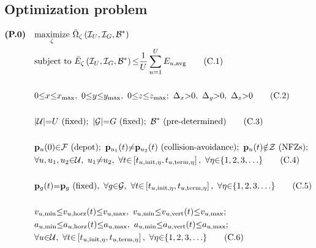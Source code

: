 \documentclass{article}
\begin{document}
\subsection{Optimization problem}
\begin{align}
    \textbf{(P.0)}\ \ \ &\underset{\zeta}{\mathrm{maximize}}\ \Bar{\Omega}_{\zeta}\left(\mathcal{I}_{U},\mathcal{I}_{G},\mathcal{B}^{*}\right)\nonumber\\
    &\text{subject to }\Bar{E}_{\zeta}\left(\mathcal{I}_{U},\mathcal{I}_{G},\mathcal{B}^{*}\right){\leq}\frac{1}{U}\sum_{u{=}1}^{U}E_{u,\mathrm{avg}}\label{Avg_energy_constraint}\tag{C.1}\\\nonumber\\
    &0{\leq}x{\leq}x_{\mathrm{max}},\ 0{\leq}y{\leq}y_{\mathrm{max}},\ 0{\leq}z{\leq}z_{\mathrm{max}};\ \Delta_{x}{>}0,\ \Delta_{y}{>}0,\ \Delta_{z}{>}0\label{Grid_tessellation_constraint}\tag{C.2}\\\nonumber\\
    &|\mathcal{U}|{=}U\text{ (fixed)};\ |\mathcal{G}|{=}G\text{ (fixed)};\ \mathcal{B}^{*}\text{ (pre-determined)}\label{Fixed_deployment_constraints}\tag{C.3}\\\nonumber\\
    &\mathbf{p}_{u}(0){\in}\mathcal{F}\text{ (depot)};\ \mathbf{p}_{u_{1}}(t){\neq}\mathbf{p}_{u_{2}}(t)\text{ (collision-avoidance)};\ \mathbf{p}_{u}(t){\notin}\mathcal{Z}\text{ (NFZs)};\nonumber\\
    &{\forall}u,u_{1},u_{2}{\in}\mathcal{U},\ u_{1}{\neq}u_{2},\ {\forall}t{\in}\left[t_{u,\mathrm{init},\eta},t_{u,\mathrm{term},\eta}\right],\ {\forall}\eta{\in}\{1,2,3,{\dots}\}\label{UAV_deployment_constraints}\tag{C.4}\\\nonumber\\
    &\mathbf{p}_{g}(t){=}\mathbf{p}_{g}\text{ (fixed)},\ {\forall}g{\in}\mathcal{G},\ {\forall}t{\in}\left[t_{u,\mathrm{init},\eta},t_{u,\mathrm{term},\eta}\right],\ {\forall}\eta{\in}\{1,2,3,{\dots}\}\label{GN_deployment_constraints}\tag{C.5}\\\nonumber\\
    &v_{u,\mathrm{min}}{\leq}v_{u,\mathrm{horz}}(t){\leq}v_{u,\mathrm{max}},\ v_{u,\mathrm{min}}{\leq}v_{u,\mathrm{vert}}(t){\leq}v_{u,\mathrm{max}};\nonumber\\
    &a_{u,\mathrm{min}}{\leq}a_{u,\mathrm{horz}}(t){\leq}a_{u,\mathrm{max}},\ a_{u,\mathrm{min}}{\leq}a_{u,\mathrm{vert}}(t){\leq}a_{u,\mathrm{max}};\nonumber\\
    &{\forall}u{\in}\mathcal{U},\ {\forall}t{\in}\left[t_{u,\mathrm{init},\eta},t_{u,\mathrm{term},\eta}\right],\ {\forall}\eta{\in}\{1,2,3,{\dots}\}\label{UAV_motion_constraints}\tag{C.6}\\\nonumber\\

\end{align}
\end{document}
